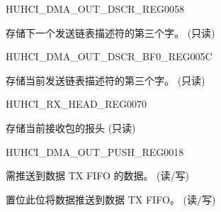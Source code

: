 \begin{register}{H}{UHCI\_DMA\_OUT\_DSCR\_REG}{\hexprefix{}0058}\label{regdesc:UHCIDMAOUTDSCRREG}
%
\regnewline%
\begin{regdesc}\begin{reglist}
\label{fielddesc:UHCIOUTLINKDSCR}\item [UHCI\_OUTLINK\_DSCR] 存储下一个发送链表描述符的第三个字。 (只读)
\end{reglist}\end{regdesc}
\end{register}


\begin{register}{H}{UHCI\_DMA\_OUT\_DSCR\_BF0\_REG}{\hexprefix{}005C}\label{regdesc:UHCIDMAOUTDSCRBF0REG}
%
\regnewline%
\begin{regdesc}\begin{reglist}
\label{fielddesc:UHCIOUTLINKDSCRBF0}\item [UHCI\_OUTLINK\_DSCR\_BF0] 存储当前发送链表描述符的第三个字。 (只读)
\end{reglist}\end{regdesc}
\end{register}


\begin{register}{H}{UHCI\_RX\_HEAD\_REG}{\hexprefix{}0070}\label{regdesc:UHCIRXHEADREG}
%
\regnewline%
\begin{regdesc}\begin{reglist}
\label{fielddesc:UHCIRXHEAD}\item [UHCI\_RX\_HEAD] 存储当前接收包的报头 (只读)
\end{reglist}\end{regdesc}
\end{register}


\begin{register}{H}{UHCI\_DMA\_OUT\_PUSH\_REG}{\hexprefix{}0018}\label{regdesc:UHCIDMAOUTPUSHREG}
%
%
%
%
\regnewline%
\begin{regdesc}\begin{reglist}
\label{fielddesc:UHCIOUTFIFOWDATA}\item [UHCI\_OUTFIFO\_WDATA] 需推送到数据 TX FIFO 的数据。 (读/写)
\label{fielddesc:UHCIOUTFIFOPUSH}\item [UHCI\_OUTFIFO\_PUSH] 置位此位将数据推送到数据 TX FIFO。 (读/写)
\end{reglist}\end{regdesc}
\end{register}


